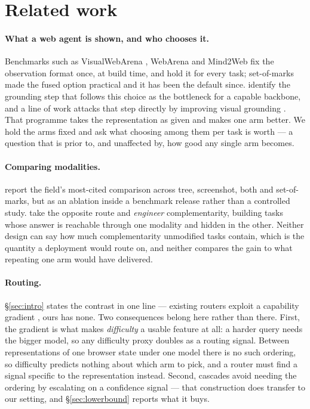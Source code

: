 
\section{Related work}\label{app:related}

\paragraph{What a web agent is shown, and who chooses it.} Benchmarks such as VisualWebArena \citep{koh2024visualwebarena}, WebArena \citep{zhou2024webarena} and Mind2Web \citep{deng2023mind2web} fix the observation format once, at build time, and hold it for every task; set-of-marks \citep{yang2023som} made the fused option practical and it has been the default since. \citet{zheng2024seeact} identify the grounding step that follows this choice as the bottleneck for a capable backbone, and a line of work attacks that step directly by improving visual grounding \citep{zheng2024uground}. That programme takes the representation as given and makes one arm better. We hold the arms fixed and ask what choosing among them per task is worth --- a question that is prior to, and unaffected by, how good any single arm becomes.

\paragraph{Comparing modalities.} \citet{xie2024osworld} report the field's most-cited comparison across tree, screenshot, both and set-of-marks, but as an ablation inside a benchmark release rather than a controlled study. \citet{levy2026stwebagentbench} take the opposite route and \emph{engineer} complementarity, building tasks whose answer is reachable through one modality and hidden in the other. Neither design can say how much complementarity unmodified tasks contain, which is the quantity a deployment would route on, and neither compares the gain to what repeating one arm would have delivered.

\paragraph{Routing.} \S\ref{sec:intro} states the contrast in one line --- existing routers exploit a capability gradient \citep{chen2023frugalgpt,ong2025routellm,webrouter2025,liu2026adaptive,moslem2026routingsurvey}, ours has none. Two consequences belong here rather than there. First, the gradient is what makes \emph{difficulty} a usable feature at all: a harder query needs the bigger model, so any difficulty proxy doubles as a routing signal. Between representations of one browser state under one model there is no such ordering, so difficulty predicts nothing about which arm to pick, and a router must find a signal specific to the representation instead. Second, cascades avoid needing the ordering by escalating on a confidence signal \citep{gupta2024cascades,kadavath2022know} --- that construction does transfer to our setting, and \S\ref{sec:lowerbound} reports what it buys.

